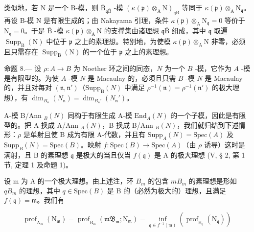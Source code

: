 类似地，若 N 是一个 B-模，则 \(\overline{\mathrm{B}}_{\mathfrak{q}\overline{\mathrm{B}}}\) -模 \(\left(\kappa(\mathfrak{p})\otimes_{\mathrm{A}}\mathrm{N}\right)_{\mathfrak{q}\overline{\mathrm{B}}}\) 等同于 \(\kappa(\mathfrak{p})\otimes_{\mathrm{A}}\mathrm{N}_{\mathfrak{q}}\)。再设 B-模 N 是有限生成的；由 Nakayama 引理，条件 \(\kappa(\mathfrak{p})\otimes_{\mathrm{A}}\mathrm{N}_{\mathfrak{q}}=0\) 等价于 \(\mathrm{N}_{\mathfrak{q}}=0\)。于是 \(\overline{\mathrm{B}}\) -模 \(\kappa(\mathfrak{p})\otimes_{\mathrm{A}}\mathrm{N}\) 的支撑集由诸理想 \(\mathfrak{q}\overline{\mathrm{B}}\) 组成，其中 \(\mathfrak{q}\) 取遍 \(\operatorname{Supp}_{\mathrm{B}}(\mathrm{N})\) 中位于 \(\mathfrak{p}\) 之上的素理想。特别地，为使模 \(\kappa(\mathfrak{p})\otimes_{\mathrm{A}}\mathrm{N}\) 非零，必须且只需存在 \(\operatorname{Supp}_{\mathrm{B}}(\mathrm{N})\) 的一个位于 \(\mathfrak{p}\) 之上的素理想。

命题 8.--- 设 \(\rho: A \to B\) 为 Noether 环之间的同态，\(N\) 为一个 \(B\) -模，它作为 \(A\) -模是有限型的。为使 \(A\) -模 \(N\) 是 Macaulay 的，必须且只需 \(B\) -模 \(N\) 是 Macaulay 的，并且对每对 \((\mathfrak{n}, \mathfrak{n}')\)（\(\mathrm{Supp}_{\mathrm{B}}(N)\) 中满足 \(\rho^{-1}(\mathfrak{n}) = \rho^{-1}(\mathfrak{n}')\) 的极大理想），有 \(\dim_{B_{\mathfrak{n}}} (N_{\mathfrak{n}}) = \dim_{B_{\mathfrak{n}}'} (N_{\mathfrak{n}}')\)。

A-模 B/Ann \(_B(N)\) 同构于有限生成 A-模 \(\text{End}_A(N)\) 的一个子模，因此是有限型的。把 A 换成 A/Ann \(_A(N)\)，B 换成 B/Ann \(_B(N)\)，我们就归结到下述情形：\(\rho\) 是单射且使 B 成为有限 A-代数，并且有 \(\text{Supp}_A(N) = \text{Spec}(A)\) 及 \(\text{Supp}_B(N) = \text{Spec}(B)\)。映射 \(f: \text{Spec}(B) \to \text{Spec}(A)\)（由 \(\rho\) 诱导）这时是满射，且 B 的素理想 \(\mathfrak{q}\) 是极大的当且仅当 \(f(\mathfrak{q})\) 是 A 的极大理想 (V, § 2, 第 1 节, 定理 1 及命题 1)。

设 m 为 A 的一个极大理想。由上述注，环 \(B_{m}\) 的包含 \(mB_{m}\) 的素理想是形如 \(qB_{m}\) 的理想，其中 \(q \in \text{Spec}(B)\) 是 B 的（必然为极大的）理想，且满足 \(f(\mathfrak{q}) = \mathfrak{m}\)。我们有

\[
\operatorname{prof} _ {\mathrm{A} _ {\mathfrak {m}}} \left(\mathrm{N} _ {\mathfrak {m}}\right) = \operatorname{prof} _ {\mathrm{B} _ {\mathfrak {m}}} \left(\mathfrak {m B} _ {\mathfrak {m}}; \mathrm{N} _ {\mathfrak {m}}\right) = \inf _ {\mathfrak {q} \in f ^ {- 1} (\mathfrak {m})} \left(\operatorname{prof} _ {\mathrm{B} _ {\mathfrak {q}}} \left(\mathrm{N} _ {\mathfrak {q}}\right)\right)
\]

